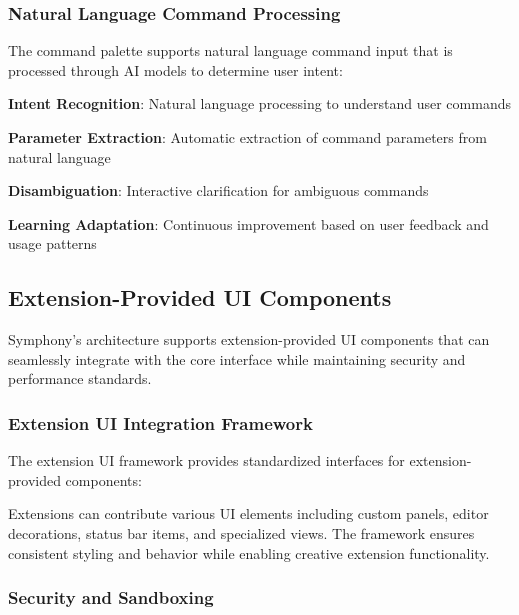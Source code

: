 \subsubsection*{Natural Language Command Processing}

The command palette supports natural language command input that is processed through AI models to determine user intent:

\begin{compactlist}
    \item \textbf{Intent Recognition}: Natural language processing to understand user commands
    \item \textbf{Parameter Extraction}: Automatic extraction of command parameters from natural language
    \item \textbf{Disambiguation}: Interactive clarification for ambiguous commands
    \item \textbf{Learning Adaptation}: Continuous improvement based on user feedback and usage patterns
\end{compactlist}

\subsection*{Extension-Provided UI Components}

Symphony's architecture supports extension-provided UI components that can seamlessly integrate with the core interface while maintaining security and performance standards.

\subsubsection*{Extension UI Integration Framework}

The extension UI framework provides standardized interfaces for extension-provided components:

\begin{infobox}[title=Extension UI Capabilities]
Extensions can contribute various UI elements including custom panels, editor decorations, status bar items, and specialized views. The framework ensures consistent styling and behavior while enabling creative extension functionality.
\end{infobox}

\subsubsection*{Security and Sandboxing}

